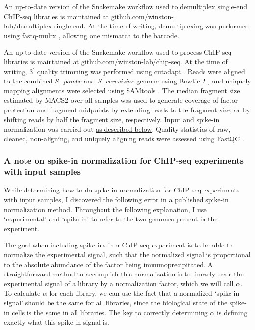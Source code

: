 An up-to-date version of the Snakemake \citep{koster2012} workflow used to demultiplex single-end ChIP-seq libraries is maintained at \href{https://github.com/winston-lab/demultiplex-single-end}{github.com/winston-\\lab/demultiplex-single-end}.
At the time of writing, demultiplexing was performed using fastq-multx \citep{aronesty2013}, allowing one mismatch to the barcode.

An up-to-date version of the Snakemake \citep{koster2012} workflow used to process ChIP-seq libraries is maintained at \href{https://github.com/winston-lab/chip-seq}{github.com/winston-lab/chip-seq}.
At the time of writing, 3$^\prime$ quality trimming was performed using cutadapt \citep{martin2011}.
Reads were aligned to the combined \textit{S. pombe} and \textit{S. cerevisiae} genome using Bowtie 2 \citep{langmead2012}, and uniquely mapping alignments were selected using SAMtools \citep{li2009}.
The median fragment size estimated by MACS2 \citep{zhang2008} over all samples was used to generate coverage of factor protection and fragment midpoints by extending reads to the fragment size, or by shifting reads by half the fragment size, respectively.
Input and spike-in normalization was carried out \hyperref[subsubsec:chip_spikein]{as described below}.
Quality statistics of raw, cleaned, non-aligning, and uniquely aligning reads were assessed using FastQC \citep{andrews2010}.

\subsubsection{A note on spike-in normalization for ChIP-seq experiments with input samples}
\label{subsubsec:chip_spikein}

While determining how to do spike-in normalization for ChIP-seq experiments with input samples, I discovered the following error in a published spike-in normalization method.
Throughout the following explanation, I use `experimental' and `spike-in' to refer to the two genomes present in the experiment.

The goal when including spike-ins in a ChIP-seq experiment is to be able to normalize the experimental signal, such that the normalized signal is proportional to the absolute abundance of the factor being immunoprecipitated.
A straightforward method to accomplish this normalization is to linearly scale the experimental signal of a library by a normalization factor, which we will call $\alpha$.
To calculate $\alpha$ for each library, we can use the fact that a normalized `spike-in signal' should be the same for all libraries, since the biological state of the spike-in cells is the same in all libraries.
The key to correctly determining $\alpha$ is defining exactly what this spike-in signal is.

